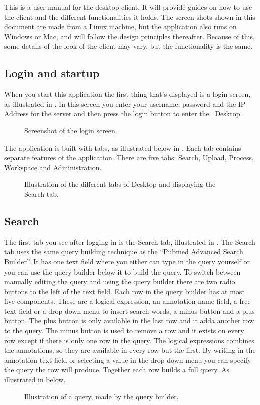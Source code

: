 This is a user manual for the desktop client. It will provide guides on how to 
use the client and the different functionalities it holds. The screen shots 
shown in this document are made from a Linux machine, but the application 
also runs on Windows or Mac, and will follow the design principles thereafter. 
Because of this, some details of the look of the client may vary, but the functionality is the same.

\subsection{Login and startup}
When you start this application the first thing that's displayed is a login screen, as illustrated in . In this screen you enter your username, password and the IP-Address for the server and then press the login button to enter the \appName\ Desktop.

\begin{figure}[h!]
	\caption{Screenshot of the login screen.}
	\label{fig:des_login-pic}
\end{figure}
The application is built with tabs, as illustrated below in . Each tab contains separate features of the application. There are five tabs: Search, Upload, Process, Workspace and Administration.
\begin{figure}[htb]
	\caption{Illustration of the different tabs of \appName Desktop and displaying the Search tab.}
	\label{fig:des_tabs-view}
\end{figure}
\FloatBarrier

\subsection{Search}
The first tab you see after logging in is the Search tab, illustrated in . The Search tab uses the same query building technique as the “Pubmed Advanced Search Builder”\cite{des_3}. It has one text field where you either can type in the query yourself or you can use the query builder below it to build the query. To switch between manually editing the query and using the query builder there are two radio buttons to the left of the text field. Each row in the query builder has at most five components. These are a logical expression, an annotation name field, a free text field or a drop down menu to insert search words, a minus button and a plus button. The plus button is only available in the last row and it adda another row to the query. The minus button is used to remove a row and it exists on every row except if there is only one row in the query. The logical expressions combines the annotations, so they are available in every row but the first.
By writing in the annotation text field or selecting a value in the drop down menu you can specify the query the row will produce. Together each row builds a full query. As illustrated in  below.
\begin{figure}[htb]
	\caption{Illustration of a query, made by the query builder.}
	\label{fig:des_search-query}
\end{figure}
\FloatBarrier
